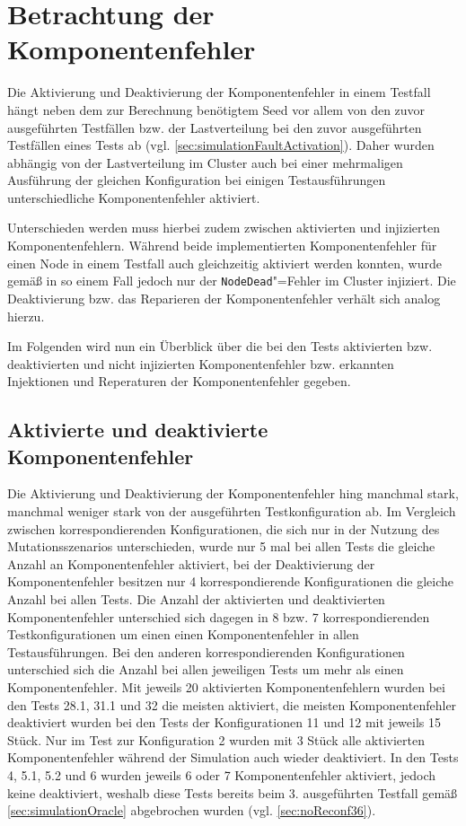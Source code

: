 \section{Betrachtung der Komponentenfehler}
\label{sec:faultEval}

Die Aktivierung und Deaktivierung der Komponentenfehler in einem Testfall hängt neben dem zur Berechnung benötigtem Seed vor allem von den zuvor ausgeführten Testfällen bzw. der Lastverteilung bei den zuvor ausgeführten Testfällen eines Tests ab (vgl. \autoref{sec:simulationFaultActivation}).
Daher wurden abhängig von der Lastverteilung im Cluster auch bei einer mehrmaligen Ausführung der gleichen Konfiguration bei einigen Testausführungen unterschiedliche Komponentenfehler aktiviert.

Unterschieden werden muss hierbei zudem zwischen aktivierten und injizierten Komponentenfehlern.
Während beide implementierten Komponentenfehler für einen Node in einem Testfall auch gleichzeitig aktiviert werden konnten, wurde gemäß  in so einem Fall jedoch nur der \texttt{NodeDead}"=Fehler im Cluster injiziert.
Die Deaktivierung bzw. das Reparieren der Komponentenfehler verhält sich analog hierzu.

Im Folgenden wird nun ein Überblick über die bei den Tests aktivierten bzw. deaktivierten und nicht injizierten Komponentenfehler bzw. erkannten Injektionen und Reperaturen der Komponentenfehler gegeben.

\subsection{Aktivierte und deaktivierte Komponentenfehler}
\label{sec:actDeactFaults}

Die Aktivierung und Deaktivierung der Komponentenfehler hing manchmal stark, manchmal weniger stark von der ausgeführten Testkonfiguration ab.
Im Vergleich zwischen korrespondierenden Konfigurationen, die sich nur in der Nutzung des Mutationsszenarios unterschieden, wurde nur 5 mal bei allen Tests die gleiche Anzahl an Komponentenfehler aktiviert, bei der Deaktivierung der Komponentenfehler besitzen nur 4 korrespondierende Konfigurationen die gleiche Anzahl bei allen Tests.
Die Anzahl der aktivierten und deaktivierten Komponentenfehler unterschied sich dagegen in 8 bzw. 7 korrespondierenden Testkonfigurationen um einen einen Komponentenfehler in allen Testausführungen.
Bei den anderen korrespondierenden Konfigurationen unterschied sich die Anzahl bei allen jeweiligen Tests um mehr als einen Komponentenfehler.
Mit jeweils 20 aktivierten Komponentenfehlern wurden bei den Tests 28.1, 31.1 und 32 die meisten aktiviert, die meisten Komponentenfehler deaktiviert wurden bei den Tests der Konfigurationen 11 und 12 mit jeweils 15 Stück.
Nur im Test zur Konfiguration 2 wurden mit 3 Stück alle aktivierten Komponentenfehler während der Simulation auch wieder deaktiviert.
In den Tests 4, 5.1, 5.2 und 6 wurden jeweils 6 oder 7 Komponentenfehler aktiviert, jedoch keine deaktiviert, weshalb diese Tests bereits beim 3. ausgeführten Testfall gemäß \autoref{sec:simulationOracle} abgebrochen wurden (vgl. \autoref{sec:noReconf36}).

